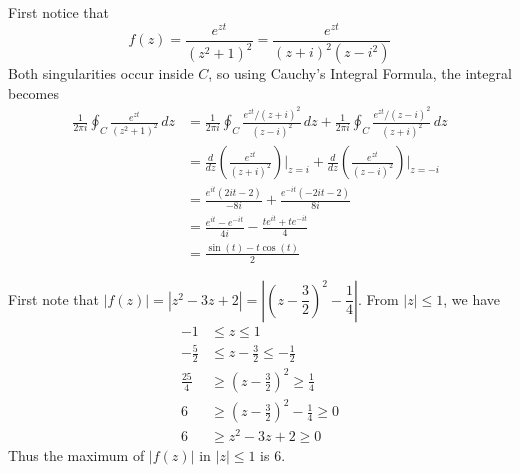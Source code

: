 \documentclass{article}
\theoremstyle{definition}
\begin{document}
    
    \begin{prob}{5.39} $  $ \vspace{2mm} \\
    	First notice that 
    	\[ f(z) = \frac{e^{zt}}{(z^2+1)^2} = \frac{e^{zt}}{(z+i)^2(z-i^2)} \]
    	Both singularities occur inside $ C $, so using Cauchy's Integral Formula, the integral becomes
    	\begin{align*}
    		\frac{1}{2\pi i} \oint_C \frac{e^{zt}}{(z^2+1)^2} \, dz &= \frac{1}{2\pi i} \oint_C \frac{e^{zt}/(z+i)^2}{(z-i)^2} \, dz + \frac{1}{2\pi i} \oint_C \frac{e^{zt}/(z-i)^2}{(z+i)^2} \, dz \\
    		&= \frac{d}{dz} \left( \frac{e^{zt}}{(z+i)^2} \right) \Bigg|_{z=i} + \frac{d}{dz} \left( \frac{e^{zt}}{(z-i)^2} \right) \Bigg|_{z=-i} \\
    		&= \frac{e^{it}(2it-2)}{-8i} + \frac{e^{-it}(-2it-2)}{8i} \\
    		&= \frac{e^{it}-e^{-it}}{4i} - \frac{te^{it}+te^{-it}}{4} \\
    		&= \boxed{\frac{\sin(t) - t\cos(t)}{2}}
    	\end{align*}
    \end{prob}
    
    
    \begin{prob}{5.39} $  $ \vspace{2mm} \\
    	First note that $ |f(z)| = |z^2-3z+2| = \left| \left( z- \dfrac{3}{2} \right)^2 - \dfrac{1}{4} \right| $. From $ |z| \leq 1 $, we have 
			\begin{align*}
				-1 &\leq z \leq 1 \\
				-\frac{5}{2} &\leq z - \frac{3}{2} \leq -\frac{1}{2} \\
				\frac{25}{4} &\geq \left( z - \frac{3}{2} \right)^2 \geq \frac{1}{4} \\
				6 &\geq \left( z - \frac{3}{2} \right)^2 - \frac{1}{4} \geq 0 \\
				6 &\geq z^2-3z+2 \geq 0
			\end{align*}
			Thus the maximum of $ |f(z)| $ in $ |z| \leq 1 $ is 6.
    \end{prob}
    
    
    
    
    
    
    
    
    
    
    
    
    
    
    
\end{document}
